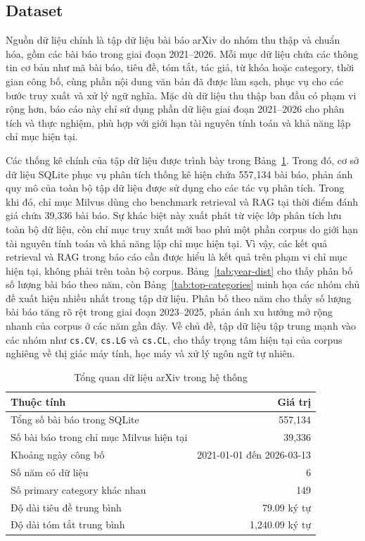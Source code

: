 \documentclass[conference]{IEEEtran}
\begin{document}
\subsection{Dataset}

Nguồn dữ liệu chính là tập dữ liệu bài báo arXiv do nhóm thu thập và chuẩn hóa, gồm các bài báo trong giai đoạn 2021--2026. Mỗi mục dữ liệu chứa các thông tin cơ bản như mã bài báo, tiêu đề, tóm tắt, tác giả, từ khóa hoặc category, thời gian công bố, cùng phần nội dung văn bản đã được làm sạch, phục vụ cho các bước truy xuất và xử lý ngữ nghĩa. Mặc dù dữ liệu thu thập ban đầu có phạm vi rộng hơn, báo cáo này chỉ sử dụng phần dữ liệu giai đoạn 2021--2026 cho phân tích và thực nghiệm, phù hợp với giới hạn tài nguyên tính toán và khả năng lập chỉ mục hiện tại.

Các thống kê chính của tập dữ liệu được trình bày trong Bảng~\ref{tab:data-overview}. Trong đó, cơ sở dữ liệu SQLite phục vụ phân tích thống kê hiện chứa 557,134 bài báo, phản ánh quy mô của toàn bộ tập dữ liệu được sử dụng cho các tác vụ phân tích. Trong khi đó, chỉ mục Milvus dùng cho benchmark retrieval và RAG tại thời điểm đánh giá chứa 39,336 bài báo. Sự khác biệt này xuất phát từ việc lớp phân tích lưu toàn bộ dữ liệu, còn chỉ mục truy xuất mới bao phủ một phần corpus do giới hạn tài nguyên tính toán và khả năng lập chỉ mục hiện tại. Vì vậy, các kết quả retrieval và RAG trong báo cáo cần được hiểu là kết quả trên phạm vi chỉ mục hiện tại, không phải trên toàn bộ corpus. Bảng~\ref{tab:year-dist} cho thấy phân bố số lượng bài báo theo năm, còn Bảng~\ref{tab:top-categories} minh họa các nhóm chủ đề xuất hiện nhiều nhất trong tập dữ liệu. Phân bố theo năm cho thấy số lượng bài báo tăng rõ rệt trong giai đoạn 2023--2025, phản ánh xu hướng mở rộng nhanh của corpus ở các năm gần đây. Về chủ đề, tập dữ liệu tập trung mạnh vào các nhóm như \texttt{cs.CV}, \texttt{cs.LG} và \texttt{cs.CL}, cho thấy trọng tâm hiện tại của corpus nghiêng về thị giác máy tính, học máy và xử lý ngôn ngữ tự nhiên.

\begin{table}[t]
\caption{Tổng quan dữ liệu arXiv trong hệ thống}
\label{tab:data-overview}
\centering
\setlength{\tabcolsep}{4pt}
\begin{tabular}{lr}
\toprule
\textbf{Thuộc tính} & \textbf{Giá trị}\\
\midrule
Tổng số bài báo trong SQLite & 557,134\\
Số bài báo trong chỉ mục Milvus hiện tại & 39,336\\
Khoảng ngày công bố & 2021-01-01 đến 2026-03-13\\
Số năm có dữ liệu & 6\\
Số primary category khác nhau & 149\\
Độ dài tiêu đề trung bình & 79.09 ký tự\\
Độ dài tóm tắt trung bình & 1,240.09 ký tự\\
\bottomrule
\end{tabular}
\end{table}
\end{document}
